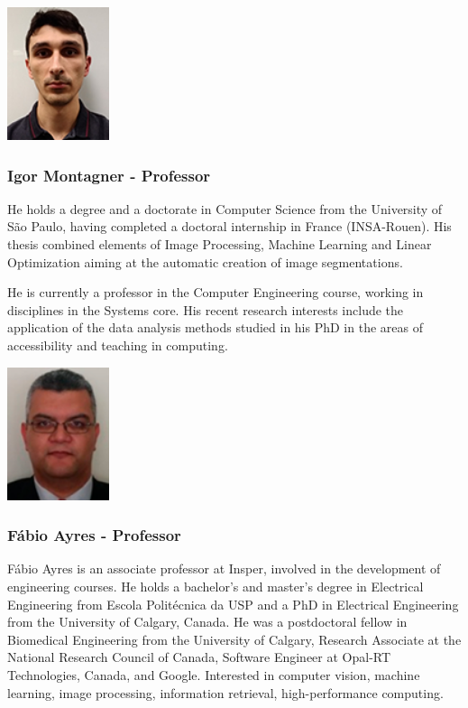 \begin{multicols}{2}
\includegraphics[width=3cm]{imgs/Igor-dos-Santos-Montagner.jpg}
\columnbreak
\subsubsection{Igor Montagner - Professor}

He holds a degree and a doctorate in Computer Science from the University of São Paulo, having completed a doctoral internship in France (INSA-Rouen). His thesis combined elements of Image Processing, Machine Learning and Linear Optimization aiming at the automatic creation of image segmentations.

He is currently a professor in the Computer Engineering course, working in disciplines in the Systems core. His recent research interests include the application of the data analysis methods studied in his PhD in the areas of accessibility and teaching in computing.

\end{multicols}

\begin{multicols}{2}
\includegraphics[width=3cm]{imgs/fabio-ayres.png}
\columnbreak
\subsubsection{Fábio Ayres - Professor}

Fábio Ayres is an associate professor at Insper, involved in the development of engineering courses. He holds a bachelor's and master's degree in Electrical Engineering from Escola Politécnica da USP and a PhD in Electrical Engineering from the University of Calgary, Canada. He was a postdoctoral fellow in Biomedical Engineering from the University of Calgary, Research Associate at the National Research Council of Canada, Software Engineer at Opal-RT Technologies, Canada, and Google. Interested in computer vision, machine learning, image processing, information retrieval, high-performance computing.

\end{multicols}


